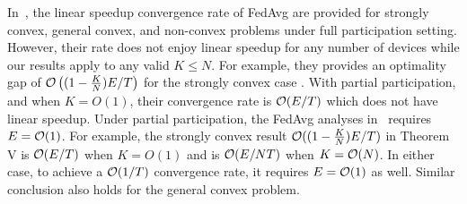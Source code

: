 In~\cite{karimireddy2019scaffold}, the linear speedup convergence rate of FedAvg are provided for strongly convex, general convex, and non-convex problems 
under full participation setting. However, their rate does not enjoy linear speedup for any number of devices while our results apply to any valid $K\leq N$. For example,  they provides an optimality gap of ${\mathcal{O}}\left((1-\frac{K}{N})E/T\right)$ for the strongly convex case \cite[Theorem V]{karimireddy2019scaffold}.
With partial participation, and when $K=O(1)$, their convergence rate is ${\mathcal{O}}(E/T)$ which does not have linear speedup. 
Under partial participation, the FedAvg analyses in~\cite{karimireddy2019scaffold} requires $E={\mathcal{O}}(1)$. For example, the strongly convex result ${\mathcal{O}}((1-\frac{K}{N})E/T)$ in Theorem V is ${\mathcal{O}}(E/T)$ when $K=O(1)$ and is ${\mathcal{O}}(E/NT)$ when $K={\mathcal{O}}(N)$. In either case, to achieve a ${\mathcal{O}}(1/T)$ convergence rate, it requires $E={\mathcal{O}}(1)$ as well. Similar conclusion also holds for the general convex problem. 


